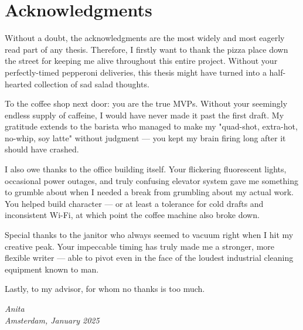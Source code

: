 \chapter*{Acknowledgments}

Without a doubt, the acknowledgments are the most widely and most eagerly read part of any thesis.
Therefore, I firstly want to thank the pizza place down the street for keeping me alive throughout this entire project. Without your perfectly-timed pepperoni deliveries, this thesis might have turned into a half-hearted collection of sad salad thoughts.

To the coffee shop next door: you are the true \glspl{MVP}. Without your seemingly endless supply of caffeine, I would have never made it past the first draft. My gratitude extends to the barista who managed to make my "quad-shot, extra-hot, no-whip, soy latte" without judgment --- you kept my brain firing long after it should have crashed.

I also owe thanks to the office building itself. Your flickering fluorescent lights, occasional power outages, and truly confusing elevator system gave me something to grumble about when I needed a break from grumbling about my actual work. You helped build character --- or at least a tolerance for cold drafts and inconsistent Wi-Fi, at which point the coffee machine also broke down.

Special thanks to the janitor who always seemed to vacuum right when I hit my creative peak. Your impeccable timing has truly made me a stronger, more flexible writer --- able to pivot even in the face of the loudest industrial cleaning equipment known to man.

Lastly, to my advisor, for whom no thanks is too much.

\begin{flushright}
{\makeatletter\itshape
    Anita \\
    Amsterdam, January 2025
\makeatother}
\end{flushright}


